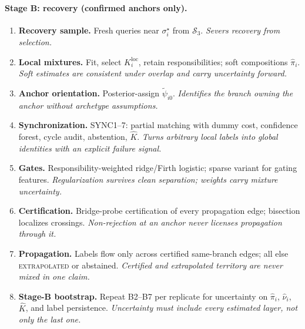 \documentclass[11pt]{article}
\begin{document}
\paragraph{Stage B: recovery (confirmed anchors only).}
\begin{enumerate}[label=\textbf{B\arabic*.},leftmargin=2.7em]
  \item \textbf{Recovery sample.} Fresh queries near \(\sigma_i^\star\) from
  \(\mathcal S_3\). \emph{Severs recovery from selection.}
  \item \textbf{Local mixtures.} Fit, select \(K_i^{\mathrm{loc}}\), retain
  responsibilities; soft compositions \(\widehat\pi_i\). \emph{Soft estimates are consistent
  under overlap and carry uncertainty forward.}
  \item \textbf{Anchor orientation.} Posterior-assign \(\tilde\psi_{i0}\).
  \emph{Identifies the branch owning the anchor without archetype assumptions.}
  \item \textbf{Synchronization.} SYNC1--7: partial matching with dummy cost, confidence
  forest, cycle audit, abstention, \(\widehat K\). \emph{Turns arbitrary local labels into
  global identities with an explicit failure signal.}
  \item \textbf{Gates.} Responsibility-weighted ridge/Firth logistic; sparse variant for
  gating features. \emph{Regularization survives clean separation; weights carry mixture
  uncertainty.}
  \item \textbf{Certification.} Bridge-probe certification of every propagation edge;
  bisection localizes crossings. \emph{Non-rejection at an anchor never licenses
  propagation through it.}
  \item \textbf{Propagation.} Labels flow only across certified same-branch edges; all else
  \textsc{extrapolated} or abstained. \emph{Certified and extrapolated territory are never
  mixed in one claim.}
  \item \textbf{Stage-B bootstrap.} Repeat B2--B7 per replicate for uncertainty on
  \(\widehat\pi_i\), \(\widehat\nu_i\), \(\widehat K\), and label persistence.
  \emph{Uncertainty must include every estimated layer, not only the last one.}
\end{enumerate}
\end{document}
